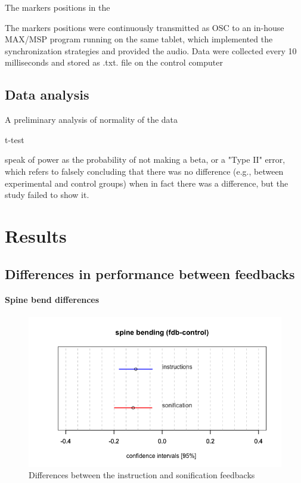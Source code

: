 \documentclass[10pt,letterpaper]{article}
\begin{document}
The markers positions in the 

The markers positions were continuously transmitted as OSC to an in-house MAX/MSP program running on the same tablet, which implemented the synchronization strategies and provided the audio. Data were collected every 10 milliseconds and stored as .txt. file on the control computer





\subsection*{Data analysis}

A preliminary analysis of normality of the data 

t-test 


speak of power as the probability of not making a beta, or a "Type II" error, which refers to falsely concluding that there was no difference (e.g., between experimental and control groups) when in fact there was a difference, but the study failed to show it.

\section*{Results} \label{sec:results}



\subsection*{Differences in performance between feedbacks}


\paragraph{Spine bend differences}

\begin{figure}[!h]
\center
  \includegraphics[width=.5\textwidth]{figures/CI_spine_bending.png} 
  \caption{Differences between the instruction and sonification feedbacks} 
  \label{fig:boxplot}      
\end{figure}
\end{document}
